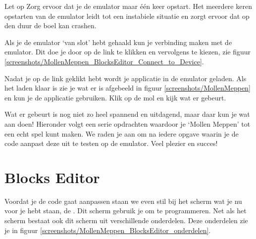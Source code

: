 \pagebreak
\begin{derivation}{Let op}
Zorg ervoor dat je de emulator maar \'e\'en keer opstart. Het meerdere keren opstarten van de emulator leidt tot een instabiele situatie en zorgt ervoor dat op den duur de boel kan crashen.
\end{derivation}


Als je de emulator `van slot' hebt gehaald kun je verbinding maken met de emulator. Dit doe je door op de  link te klikken en vervolgens  te kiezen, zie figuur \ref{screenshots/MollenMeppen_BlocksEditor_Connect_to_Device}.


Nadat je op de link geklikt hebt wordt je applicatie in de emulator geladen. Als het laden klaar is zie je wat er is afgebeeld in figuur \ref{screenshots/MollenMeppen} en kun je de applicatie gebruiken. Klik op de mol en kijk wat er gebeurt.
 
Wat er gebeurt is nog niet zo heel spannend en uitdagend, maar daar kun je wat aan doen! Hieronder volgt een serie opdrachten waardoor je `Mollen Meppen' tot een echt spel kunt maken. We raden je aan om na iedere opgave waarin je de code aanpast deze uit te testen op de emulator. Veel plezier en succes!

\section{Blocks Editor}
Voordat je de code gaat aanpassen staan we even stil bij het scherm wat je nu voor je hebt staan, de . Dit scherm gebruik je om te programmeren. Net als het  scherm bestaat ook dit scherm uit verschillende onderdelen. Deze onderdelen zie je in figuur \ref{screenshots/MollenMeppen_BlocksEditor_onderdelen}.


